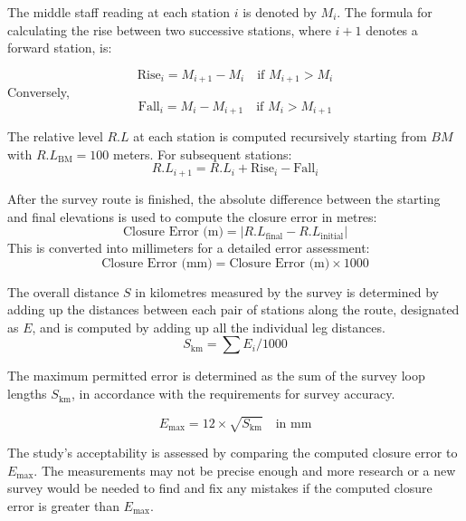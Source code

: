 \documentclass[12pt]{report}
\begin{document}
The middle staff reading at each station \( i \) is denoted by \( M_i \). The formula for calculating the rise between two successive stations, where \( i+1 \) denotes a forward station, is:

\[
\text{Rise}_{i} = M_{i+1} - M_i \quad \text{if } M_{i+1} > M_i
\]
Conversely,
\[
\text{Fall}_{i} = M_i - M_{i+1} \quad \text{if } M_i > M_{i+1}
\]

The relative level \( R.L \) at each station is computed recursively starting from \( BM \) with \( R.L_{\text{BM}} = 100 \) meters. For subsequent stations:
\[
R.L_{i+1} = R.L_i + \text{Rise}_i - \text{Fall}_i
\]

After the survey route is finished, the absolute difference between the starting and final elevations is used to compute the closure error in metres:
\[
\text{Closure Error (m)} = |R.L_{\text{final}} - R.L_{\text{initial}}|
\]
This is converted into millimeters for a detailed error assessment:
\[
\text{Closure Error (mm)} = \text{Closure Error (m)} \times 1000
\]

The overall distance \( S \) in kilometres measured by the survey is determined by adding up the distances between each pair of stations along the route, designated as \( E \), and is computed by adding up all the individual leg distances.
\[
S_{\text{km}} = \sum E_i / 1000
\]

The maximum permitted error is determined as the sum of the survey loop lengths \(S_{\text{km}} \), in accordance with the requirements for survey accuracy.

\[
E_{\max} = 12 \times \sqrt{S_{\text{km}}} \quad \text{in mm}
\]

The study's acceptability is assessed by comparing the computed closure error to \( E_{\max} \). The measurements may not be precise enough and more research or a new survey would be needed to find and fix any mistakes if the computed closure error is greater than \( E_{\max} \).
\end{document}

